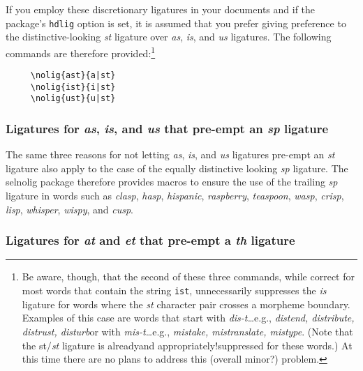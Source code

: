\documentclass[12pt]{article}
\newcommand{\pkg}[1]{\textsf{#1}}
\newcommand{\opt}[1]{\texttt{#1}}
\begin{document}
If you employ these discretionary ligatures in your documents and if the package's \opt{hdlig} option is set, it is assumed that you prefer giving preference to the distinctive-looking \emph{st} ligature over \emph{as}, \emph{is}, and \emph{us} ligatures. The following commands are therefore provided:\footnote{Be aware, though, that the second of these three commands, while correct for most words that contain the string \opt{ist}, unnecessarily suppresses the \emph{is} ligature for words where the \emph{st} character pair crosses a morpheme boundary. Examples of this case are words that start with \emph{dis-t\ldots}\textemdash e.g., \emph{distend, distribute, distrust, disturb}\textemdash or with \emph{mis-t\ldots}\textemdash e.g., \emph{mistake, mistranslate, mistype}. (Note that the st/\emph{st} ligature is already\textemdash and appropriately!\textemdash suppressed for these words.) At this time there are no plans to address this (overall minor?) problem.}
\begin{Verbatim}
     \nolig{ast}{a|st}
     \nolig{ist}{i|st}
     \nolig{ust}{u|st}
\end{Verbatim}



\subsubsection{Ligatures for \emph{as}, \emph{is}, and \emph{us} that pre-empt an \emph{sp} ligature}

The same three reasons for not letting \emph{as}, \emph{is}, and \emph{us} ligatures pre-empt an \emph{st} ligature also apply to the case of the equally distinctive looking \emph{sp} ligature. The \pkg{selnolig} package therefore provides macros to ensure the use of the trailing \emph{sp} ligature in words such as \emph{clasp}, \emph{hasp}, \emph{hispanic}, \emph{raspberry}, \emph{teaspoon}, \emph{wasp}, \emph{crisp}, \emph{lisp}, \emph{whisper}, \emph{wispy}, and \emph{cusp}. 




\subsubsection{Ligatures for \emph{at} and \emph{et} that pre-empt a \emph{th} ligature}
\end{document}
